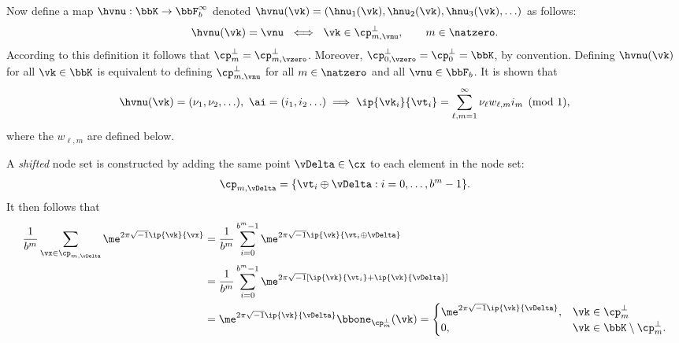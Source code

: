 \documentclass[]{elsarticle}
\theoremstyle{definition}
\begin{document}
Now define a map $\hvnu: \bbK \to \bbF_b^\infty$ denoted $\hvnu(\vk)=(\hnu_1(\vk), \hnu_2(\vk), \hnu_3(\vk), \ldots )$ as follows:
\[
\hvnu(\vk)=\vnu \ \iff \ \vk \in \cp_{m,\vnu}^{\perp}, \qquad m \in \natzero.
\]
According to this definition it follows that $\cp_{m}^{\perp}=\cp_{m,\vzero}^{\perp}$.  Moreover, $\cp_{0,\vzero}^{\perp}=\cp_{0}^{\perp}=\bbK$, by convention.  Defining $\hvnu(\vk)$ for all $\vk \in \bbK$ is equivalent to defining $\cp_{m,\vnu}^{\perp}$ for all $m \in \natzero$ and all $\vnu \in \bbF_b$.  It is shown that
\begin{equation} \label{nuwisum}
\hvnu(\vk)=(\nu_1, \nu_2, \ldots),\  \ai=(i_1, i_2 \ldots) \implies{} \ip{\vk_i}{\vt_i} = \sum_{\ell,m=1}^{\infty} \nu_\ell w_{\ell,m} i_m \pmod 1,
\end{equation}
where the $w_{\ell,m}$ are defined below.  

A \emph{shifted} node set is constructed by adding the same point $\vDelta \in \cx$ to each element in the node set: 
\begin{equation*}
\cp_{m,\vDelta} = \{ \vt_i \oplus \vDelta : i=0, \ldots, b^m -1\}.
\end{equation*}
It then follows that 
\begin{align*}
\frac{1}{b^m} \sum_{\vx \in \cp_{m,\vDelta}} \me^{2 \pi \sqrt{-1} \ip{\vk}{\vx}}
& = \frac{1}{b^m} \sum_{i=0}^{b^m-1} \me^{2 \pi \sqrt{-1} \ip{\vk}{\vt_i \oplus \vDelta}}\\
& = \frac{1}{b^m} \sum_{i=0}^{b^m-1} \me^{2 \pi \sqrt{-1} [\ip{\vk}{\vt_i} + \ip{\vk} {\vDelta}]}\\
&= \me^{2 \pi \sqrt{-1} \ip{\vk}{\vDelta}} \bbone_{\cp_m^{\perp}}(\vk) = \begin{cases} \me^{2 \pi \sqrt{-1} \ip{\vk}{\vDelta}} , & \vk \in \cp_m^{\perp}\\
 0,  & \vk \in \bbK \setminus \cp_m^{\perp}.
 \end{cases}
\end{align*}
\end{document}
